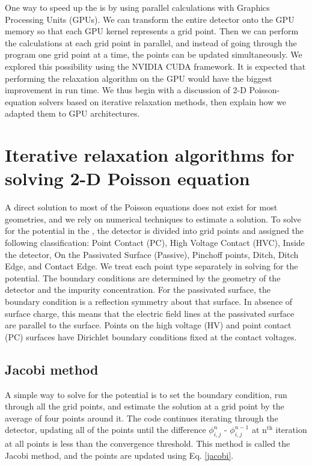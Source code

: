 One way to speed up the {\ehd} is by using parallel calculations with Graphics Processing Units (GPUs). We can transform the entire detector onto the GPU memory so that each GPU kernel represents a grid point. Then we can perform the calculations at each grid point in parallel, and instead of going through the program one grid point at a time, the points can be updated simultaneously. We explored this possibility using the NVIDIA CUDA {\cpp} framework. It is expected that performing the relaxation algorithm on the GPU would have the biggest improvement in run time. We thus begin with a discussion of 2-D Poisson-equation solvers based on iterative relaxation methods, then explain how we adapted them to GPU architectures.

\section{Iterative relaxation algorithms for solving 2-D Poisson equation}

A direct solution to most of the Poisson equations does not exist for most geometries, and we rely on numerical techniques to estimate a solution. To solve for the potential in the {\ehd}, the detector is divided into grid points and assigned the following classification: Point Contact (PC), High Voltage Contact (HVC), Inside the detector, On the Passivated Surface (Passive), Pinchoff points, Ditch, Ditch Edge, and Contact Edge. We treat each point type separately in solving for the potential. The boundary conditions are determined by the geometry of the detector and the impurity concentration. For the passivated surface, the boundary condition is a reflection symmetry about that surface. In absence of surface charge, this means that the electric field lines at the passivated surface are parallel to the surface. Points on the high voltage (HV) and point contact (PC) surfaces have Dirichlet boundary conditions fixed at the contact voltages.

\subsection{Jacobi method}
A simple way to solve for the potential is to set the boundary condition, run through all the grid points, and estimate the solution at a grid point by the average of four points around it. The code continues iterating through the detector, updating all of the points until the difference $\phi_{i,j}^{n}$ - $\phi_{i,j}^{n-1}$ at n$^{\text{th}}$ iteration at all points is less than the convergence threshold. This method is called the Jacobi method, and the points are updated using Eq. \ref{jacobi}.

